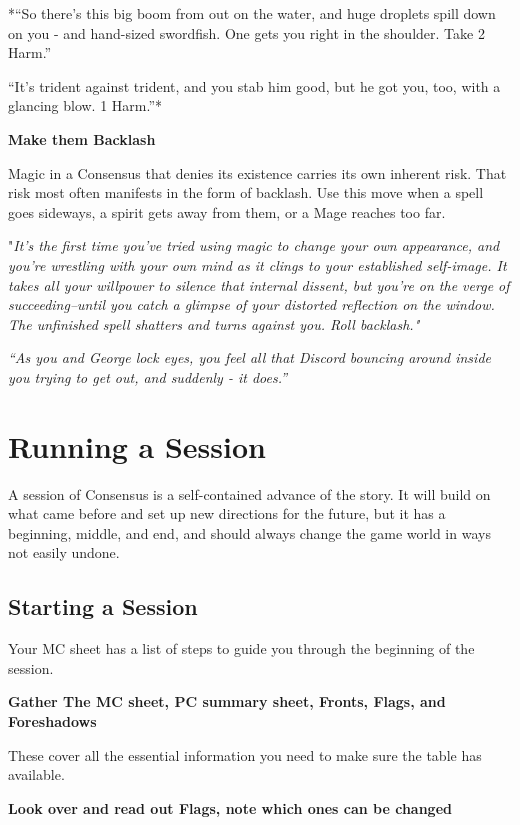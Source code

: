 \documentclass[10pt,twoside,openright]{memoir}
\begin{document}
*``So there's this big boom from out on the water, and huge droplets
spill down on you - and hand-sized swordfish. One gets you right in the
shoulder. Take 2 Harm.''

``It's trident against trident, and you stab him good, but he got you,
too, with a glancing blow. 1 Harm.''*

\textbf{Make them Backlash}

Magic in a Consensus that denies its existence carries its own inherent
risk. That risk most often manifests in the form of backlash. Use this
move when a spell goes sideways, a spirit gets away from them, or a Mage
reaches too far.

"\emph{It's the first time you've tried using magic to change your own
appearance, and you're wrestling with your own mind as it clings to your
established self-image. It takes all your willpower to silence that
internal dissent, but you're on the verge of succeeding--until you catch
a glimpse of your distorted reflection on the window. The unfinished
spell shatters and turns against you. Roll backlash."}

\emph{``As you and George lock eyes, you feel all that Discord bouncing
around inside you trying to get out, and suddenly - it does.''}

\hypertarget{running-a-session}{%
\section{Running a Session}\label{running-a-session}}

A session of Consensus is a self-contained advance of the story. It will
build on what came before and set up new directions for the future, but
it has a beginning, middle, and end, and should always change the game
world in ways not easily undone.

\hypertarget{starting-a-session}{%
\subsection{Starting a Session}\label{starting-a-session}}

Your MC sheet has a list of steps to guide you through the beginning of
the session.

\textbf{Gather The MC sheet, PC summary sheet, Fronts, Flags, and
Foreshadows}

These cover all the essential information you need to make sure the
table has available.

\textbf{Look over and read out Flags, note which ones can be changed}
\end{document}
